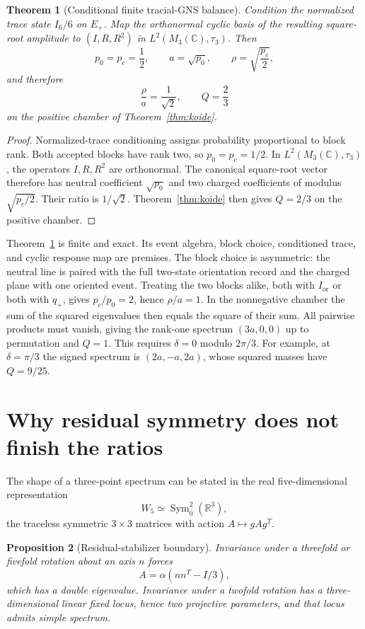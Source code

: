\documentclass[11pt]{article}
\newtheorem{theorem}{Theorem}
\newtheorem{proposition}[theorem]{Proposition}
\theoremstyle{remark}
\newcommand{\C}{\mathbb C}
\newcommand{\R}{\mathbb R}
\begin{document}
\begin{theorem}[Conditional finite tracial-GNS balance]
\label{thm:gns}
Condition the normalized trace state \(I_6/6\) on \(E_+\). Map the orthonormal
cyclic basis of the resulting square-root amplitude to
\((I,R,R^2)\) in \(L^2(M_3(\C),\tau_3)\). Then
\[
p_0=p_c=\frac12,
\qquad
a=\sqrt{p_0},
\qquad
\rho=\sqrt{\frac{p_c}{2}},
\]
and therefore
\[
\frac{\rho}{a}=\frac1{\sqrt2},
\qquad
Q=\frac23
\]
on the positive chamber of Theorem~\ref{thm:koide}.
\end{theorem}

\begin{proof}
Normalized-trace conditioning assigns probability proportional to block
rank. Both accepted blocks have rank two, so \(p_0=p_c=1/2\). In
\(L^2(M_3(\C),\tau_3)\), the operators \(I,R,R^2\) are orthonormal. The
canonical square-root vector therefore has neutral coefficient
\(\sqrt{p_0}\) and two charged coefficients of modulus
\(\sqrt{p_c/2}\). Their ratio is \(1/\sqrt2\). Theorem~\ref{thm:koide}
then gives \(Q=2/3\) on the positive chamber.
\end{proof}

Theorem~\ref{thm:gns} is finite and exact. Its event algebra, block choice,
conditioned trace, and cyclic response map are premises. The block choice is
asymmetric: the neutral line is paired with the full two-state orientation
record and the charged plane with one oriented event. Treating the two blocks
alike, both with \(I_{\mathrm{or}}\) or both with \(q_+\), gives
\(p_c/p_0=2\), hence \(\rho/a=1\). In the nonnegative chamber the sum of
the squared eigenvalues then equals the square of their sum. All pairwise
products must vanish, giving the rank-one spectrum \((3a,0,0)\) up to
permutation and \(Q=1\). This requires \(\delta=0\) modulo \(2\pi/3\).
For example, at \(\delta=\pi/3\) the signed spectrum is
\((2a,-a,2a)\), whose squared masses have \(Q=9/25\).

\section{Why residual symmetry does not finish the ratios}

The shape of a three-point spectrum can be stated in the real
five-dimensional representation
\[
W_5\simeq\operatorname{Sym}^2_0(\R^3),
\]
the traceless symmetric \(3\times3\) matrices with action
\(A\mapsto gAg^T\).

\begin{proposition}[Residual-stabilizer boundary]
Invariance under a threefold or fivefold rotation about an axis \(n\) forces
\[
A=\alpha(nn^T-I/3),
\]
which has a double eigenvalue. Invariance under a twofold rotation has a
three-dimensional linear fixed locus, hence two projective parameters, and
that locus admits simple spectrum.
\end{proposition}
\end{document}
